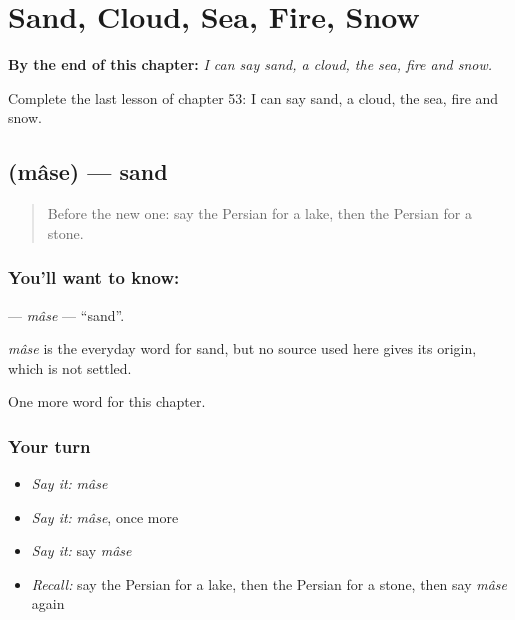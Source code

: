 
\chapter{Sand, Cloud, Sea, Fire, Snow}
\label{ch:fa-sand-cloud-sea-fire-snow}

\begin{chapteropening}
\textbf{By the end of this chapter:} \emph{I can say sand, a cloud, the sea, fire and snow.}

Complete the last lesson of chapter 53: I can say sand, a cloud, the sea, fire and snow.
\end{chapteropening}

\section[\texorpdfstring{\fa{ماسه} (mâse)}{ماسه (mâse)}]{ (mâse) — sand}

\label{lesson:FA-C53-mase}



\begin{quote}
Before the new one: say the Persian for a lake, then the Persian for a stone.
\end{quote}

\subsection*{You'll want to know: }
\textbf{} — \emph{mâse} — \textquotedblleft{}sand\textquotedblright{}.

\begin{cousinweb}
\emph{mâse} is the everyday word for sand, but no source used here gives its origin, which is not settled.
\end{cousinweb}

\begin{grammarlens}[title={What you've built}]
One more word for this chapter.
\end{grammarlens}

\subsection*{Your turn}
\begin{itemize}
\raggedright
  \item \emph{Say it:} \emph{mâse}
  \item \emph{Say it:} \emph{mâse}, once more
  \item \emph{Say it:} say \emph{mâse}
  \item \emph{Recall:} say the Persian for a lake, then the Persian for a stone, then say \emph{mâse} again
\end{itemize}

